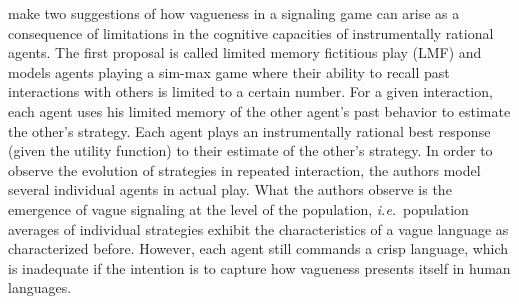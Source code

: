 \documentclass[a4paper]{article}
\begin{document}
\textcite{franke_vagueness_2011} make two suggestions of how vagueness in a signaling game can arise as a consequence of limitations in the cognitive capacities of instrumentally rational agents.
The first proposal is called limited memory fictitious play (LMF) and models agents playing a sim-max game where their ability to recall past interactions with others is limited to a certain number.
For a given interaction, each agent uses his limited memory of the other agent's past behavior to estimate the other's strategy.
Each agent plays an instrumentally rational best response (given the utility function) to their estimate of the other's strategy.
In order to observe the evolution of strategies in repeated interaction, the authors model several individual agents in actual play.
What the authors observe is the emergence of vague signaling at the level of the population, \emph{i.e.}~population averages of individual strategies exhibit the characteristics of a vague language as characterized before.
However, each agent still commands a crisp language, which is inadequate if the intention is to capture how vagueness presents itself in human languages.
\end{document}
